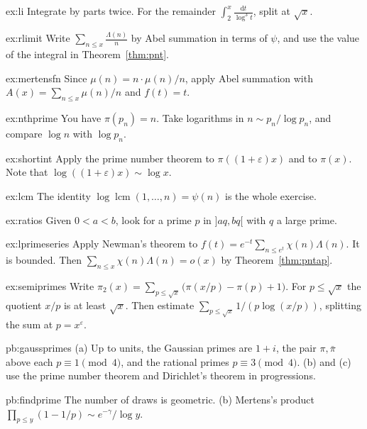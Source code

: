 \begin{hint}{ex:li}
Integrate by parts twice. For the remainder $\int_2^x\frac{\mathrm dt}{\log^3t}$, split at $\sqrt x$.
\end{hint}
\begin{hint}{ex:rlimit}
Write $\sum_{n\le x}\frac{\Lambda(n)}n$ by Abel summation in terms of $\psi$, and use the value of the integral in Theorem~\ref{thm:pnt}.
\end{hint}
\begin{hint}{ex:mertensfn}
Since $\mu(n)=n\cdot\mu(n)/n$, apply Abel summation with $A(x)=\sum_{n\le x}\mu(n)/n$ and $f(t)=t$.
\end{hint}
\begin{hint}{ex:nthprime}
You have $\pi(p_n)=n$. Take logarithms in $n\sim p_n/\log p_n$, and compare $\log n$ with $\log p_n$.
\end{hint}
\begin{hint}{ex:shortint}
Apply the prime number theorem to $\pi((1+\varepsilon)x)$ and to $\pi(x)$. Note that $\log((1+\varepsilon)x)\sim\log x$.
\end{hint}
\begin{hint}{ex:lcm}
The identity $\log\operatorname{lcm}(1,\dots,n)=\psi(n)$ is the whole exercise.
\end{hint}
\begin{hint}{ex:ratios}
Given $0<a<b$, look for a prime $p$ in $]aq,bq[$ with $q$ a large prime.
\end{hint}
\begin{hint}{ex:lprimeseries}
Apply Newman's theorem to $f(t)=e^{-t}\sum_{n\le e^t}\chi(n)\Lambda(n)$. It is bounded. Then $\sum_{n\le x}\chi(n)\Lambda(n)=o(x)$ by Theorem~\ref{thm:pntap}.
\end{hint}
\begin{hint}{ex:semiprimes}
Write $\pi_2(x)=\sum_{p\le\sqrt x}\bigl(\pi(x/p)-\pi(p)+1\bigr)$. For $p\le\sqrt x$ the quotient $x/p$ is at least $\sqrt x$. Then estimate $\sum_{p\le\sqrt x}1/(p\log(x/p))$, splitting the sum at $p=x^\varepsilon$.
\end{hint}

\begin{hint}{pb:gaussprimes}
(a) Up to units, the Gaussian primes are $1+i$, the pair $\pi,\bar\pi$ above each $p\equiv1\pmod4$, and the rational primes $p\equiv3\pmod4$. (b) and (c) use the prime number theorem and Dirichlet's theorem in progressions.
\end{hint}

\begin{hint}{pb:findprime}
The number of draws is geometric. (b) Mertens's product $\prod_{p\le y}(1-1/p)\sim e^{-\gamma}/\log y$.
\end{hint}

